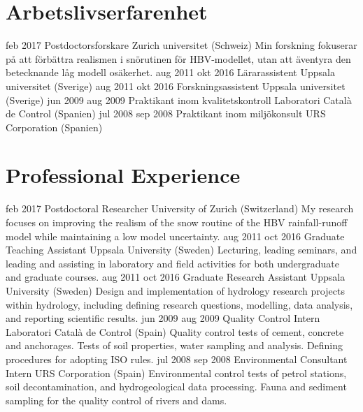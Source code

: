 \ifswedish
    \section{Arbetslivserfarenhet}
        \position
            {feb 2017 \textemdash{}}
            {Postdoctorsforskare}
            {Zurich universitet (Schweiz)}
            {Min forskning fokuserar på att förbättra realismen i snörutinen för HBV-modellet, utan att äventyra den betecknande låg modell osäkerhet.}
        \position
            {aug 2011 \textemdash{} okt 2016}
            {Lärarassistent}
            {Uppsala universitet (Sverige)}
            {}
        \position
            {aug 2011 \textemdash{} okt 2016}
            {Forskningsassistent}
            {Uppsala universitet (Sverige)}
            {}
        \position
            {jun 2009 \textemdash{} aug 2009}
            {Praktikant inom kvalitetskontroll}
            {Laboratori Català de Control (Spanien)}
            {}
        \position
            {jul 2008 \textemdash{} sep 2008}
            {Praktikant inom miljökonsult}
            {URS Corporation (Spanien)}
            {}
\else
    \section{Professional Experience}
        \position
            {feb 2017 \textemdash{}}
            {Postdoctoral Researcher}
            {University of Zurich (Switzerland)}
            {My research focuses on improving the realism of the snow routine of the HBV rainfall-runoff model while maintaining a low model uncertainty.}
        \position
            {aug 2011 \textemdash{} oct 2016}
            {Graduate Teaching Assistant}
            {Uppsala University (Sweden)}
            {Lecturing, leading seminars, and leading and assisting in laboratory and field activities for both undergraduate and graduate courses.}
        \position
            {aug 2011 \textemdash{} oct 2016}
            {Graduate Research Assistant}
            {Uppsala University (Sweden)}
            {Design and implementation of hydrology research projects within hydrology, including defining research questions, modelling, data analysis, and reporting scientific results.}
        \position
            {jun 2009 \textemdash{} aug 2009}
            {Quality Control Intern}
            {Laboratori Català de Control (Spain)}
            {Quality control tests of cement, concrete and anchorages. Tests of soil properties, water sampling and analysis. Defining procedures for adopting ISO rules.}
        \position
            {jul 2008 \textemdash{} sep 2008}
            {Environmental Consultant Intern}
            {URS Corporation (Spain)}
            {Environmental control tests of petrol stations, soil decontamination, and hydrogeological data processing. Fauna and sediment sampling for the quality control of rivers and dams.}
\fi